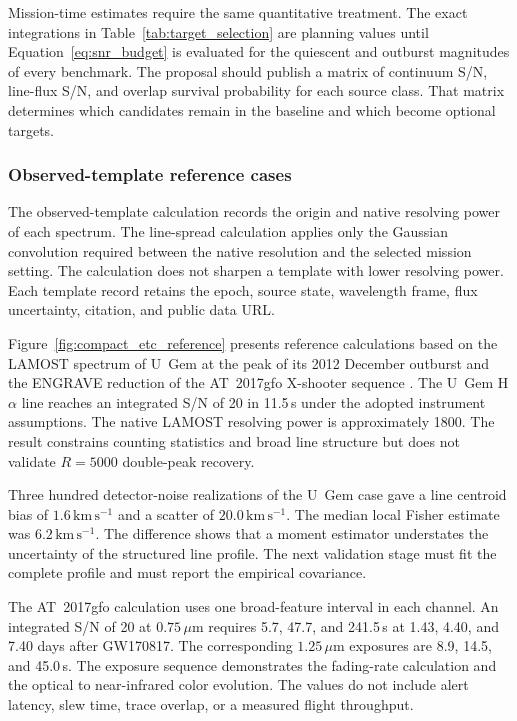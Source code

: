 \documentclass[10pt,onecolumn]{article}
\newcommand{\kms}{\mathrm{km\,s^{-1}}}
\newcommand{\micron}{\,\mu\mathrm{m}}
\begin{document}
Mission-time estimates require the same quantitative treatment. The exact
integrations in Table~\ref{tab:target_selection} are planning values until
Equation~\ref{eq:snr_budget} is evaluated for the quiescent and outburst
magnitudes of every benchmark. The proposal should publish a matrix of
continuum S/N, line-flux S/N, and overlap survival probability for each source
class. That matrix determines which candidates remain in the baseline and
which become optional targets.

\subsubsection{Observed-template reference cases}

The observed-template calculation records the origin and native resolving
power of each spectrum. The line-spread calculation applies only the Gaussian
convolution required between the native resolution and the selected mission
setting. The calculation does not sharpen a template with lower resolving
power. Each template record retains the epoch, source state, wavelength frame,
flux uncertainty, citation, and public data URL.

Figure~\ref{fig:compact_etc_reference} presents reference calculations based
on the LAMOST spectrum of U~Gem at the peak of its 2012 December outburst
\cite{zhi2020} and the ENGRAVE reduction of the AT~2017gfo X-shooter sequence
\cite{pian2017,smartt2017,engrave2019}. The U~Gem H$\alpha$ line reaches an
integrated S/N of 20 in 11.5\,s under the adopted instrument assumptions. The
native LAMOST resolving power is approximately 1800. The result constrains
counting statistics and broad line structure but does not validate
$R=5000$ double-peak recovery.

Three hundred detector-noise realizations of the U~Gem case gave a line
centroid bias of $1.6\,\kms$ and a scatter of $20.0\,\kms$. The median local
Fisher estimate was $6.2\,\kms$. The difference shows that a moment estimator
understates the uncertainty of the structured line profile. The next
validation stage must fit the complete profile and must report the empirical
covariance.

The AT~2017gfo calculation uses one broad-feature interval in each channel.
An integrated S/N of 20 at $0.75\micron$ requires 5.7, 47.7, and 241.5\,s at
1.43, 4.40, and 7.40 days after GW170817. The corresponding $1.25\micron$
exposures are 8.9, 14.5, and 45.0\,s. The exposure sequence demonstrates the
fading-rate calculation and the optical to near-infrared color evolution. The
values do not include alert latency, slew time, trace overlap, or a measured
flight throughput.
\end{document}
